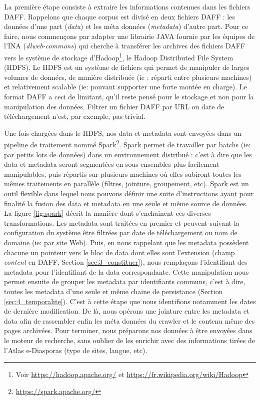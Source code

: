 \documentclass[symmetric,justified,marginals=raggedouter]{tufte-book}
\begin{document}
La première étape consiste à extraire les informations contenues dans les fichiers DAFF. Rappelons que chaque corpus est divisé en deux fichiers DAFF : les données d'une part (\textit{data}) et les méta données (\textit{metadata}) d'autre part. Pour ce faire, nous commençons par adapter une librairie JAVA fournie par les équipes de l'INA (\textit{dlweb-commons}) qui cherche à transférer les archives des fichiers DAFF vers le système de stockage d'Hadoop\footnote{Voir \url{https://hadoop.apache.org/} et \url{https://fr.wikipedia.org/wiki/Hadoop}}, le Hadoop Distributed File System (HDFS). Le HDFS est un système de fichiers qui permet de manipuler de larges volumes de données, de manière distribuée (ie : réparti entre plusieurs machines) et relativement scalable (ie: pouvant supporter une forte montée en charge). Le format DAFF a ceci de limitant, qu'il reste pensé pour le stockage et non pour la manipulation des données. Filtrer un fichier DAFF par URL ou date de téléchargement n'est, par exemple, pas trivial.

Une fois chargées dans le HDFS, nos data et metadata sont envoyées dans un pipeline de traitement nommé Spark\footnote{\url{https://spark.apache.org/}}. Spark permet de travailler par batchs (ie: par petits lots de données) dans un environnement distribué : c'est à dire que les data et metadata seront segmentées en sous ensembles plus facilement manipulables, puis répartis sur plusieurs machines où elles subiront toutes les mêmes traitements en parallèle (filtres, jointure, groupement, etc). Spark est un outil flexible dans lequel nous pouvons définir une suite d'instructions ayant pour finalité la fusion des data et metadata en une seule et même source de données. La figure \ref{fig:spark} décrit la manière dont s'enchainent ces diverses transformations. Les metadata sont traitées en premier et peuvent suivant la configuration du système être filtrées par date de téléchargement ou nom de domaine (ie: par site Web). Puis, en nous rappelant que les metadata possèdent chacune un pointeur vers le bloc de data dont elles sont l'extension (champ \textit{content} en DAFF, Section \ref{sec:3_constituer}), nous remplaçons l'identifiant des metadata pour l'identifiant de la data correspondante. Cette manipulation nous permet ensuite de grouper les metadata par identifiants communs, c'est à dire, toutes les metadata d'une seule et même chaine de persistance (Section \ref{sec:4_temporalite}). C'est à cette étape que nous identifions notamment les dates de dernière modification. De là, nous opérons une jointure entre les metadata et data afin de rassembler enfin les méta données du crawler et le contenu même des pages archivées. Pour terminer, nous préparons nos données à être envoyées dans le moteur de recherche, sans oublier de les enrichir avec des informations tirées de l'Atlas e-Diasporas (type de sites, langue, etc).  
\end{document}
